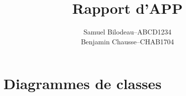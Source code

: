 \documentclass[a11paper, 11pt]{article}
\title{Rapport d'APP}
\author{
  \addtolength{\tabcolsep}{-0.4em}
  \begin{tabular}{rcl} %
  Samuel Bilodeau  & -- & ABCD1234 \\ %
  Benjamin Chausse & -- & CHAB1704 \\
  \end{tabular}
}
\begin{document}
\maketitle
\newpage
\section{Diagrammes de classes}

\end{document}

